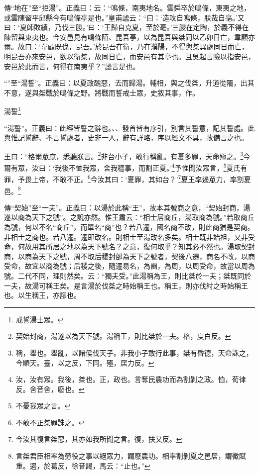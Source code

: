 {\noindent\zhuan{}\fzbyks 傳“地在”至“拒湯”。正義曰：云：“鳴條，南夷地名。雲舜卒於鳴條，東夷之地，或雲陳留平邱縣今有鳴條亭是也。”皇甫謐云：“曰：‘造攻自鳴條，朕哉自亳。’又曰：‘夏師敗績，乃伐三朡。’曰：‘王歸自克夏，至於亳。’三朡在定陶，於義不得在陳留與東夷也。今安邑見有鳴條陌、昆吾亭，以為昆吾與桀同以乙卯日亡，韋顧亦爾。故曰：‘韋顧既伐，昆吾。’於昆吾在衛，乃在濮陽，不得與桀異處同日而亡，明昆吾亦來安邑，欲以衛桀，故同日亡，而安邑有其亭也。且吳起言險以指安邑，安邑於此而言，何得在南夷乎？”謐言是也。 \par}

{\noindent\shu{}\fzkt “”至“湯誓”。正義曰：以夏政醜惡，去而歸湯。輔相，與之伐桀，升道從陑，出其不意，遂與桀戰於鳴條之野。將戰而誓戒士眾，史敘其事，作。 \par}

湯誓\footnote{戒誓湯士眾。}

{\noindent\shu{}\fzkt “湯誓”。正義曰：此經皆誓之辭也。、、發首皆有序引，別言其誓意，記其誓處。此與惟記誓辭、不言誓處者，史非一人，辭有詳略，序以經文不具，故備言之也。 \par}

王曰：“格爾眾庶，悉聽朕言。\footnote{契始封商，湯遂以為天下號。湯稱王，則比桀於一夫。格，庚白反。}非台小子，敢行稱亂。有夏多罪，天命殛之。\footnote{稱，舉也。舉亂，以諸侯伐天子。非我小子敢行此事，桀有昏德，天命誅之，今順天。臺，以之反，下同。殛，居力反。}今爾有眾，汝曰：‘我後不恤我眾，舍我穡事，而割正夏。’\footnote{汝，汝有眾。我後，桀也。正，政也。言奪民農功而為割剝之政。恤，荀律反。舍音舍，廢也。}予惟聞汝眾言，\footnote{不憂我眾之言。}夏氏有罪，予畏上帝，不敢不正。\footnote{不敢不正桀罪誅之。}今汝其曰：‘夏罪，其如台？’\footnote{今汝其復言桀惡，其亦如我所聞之言。復，扶又反。}夏王率遏眾力，率割夏邑。\footnote{言桀君臣相率為勞役之事以絕眾力，謂廢農功。相率割剝夏之邑居，謂徵賦重。遏，於葛反，徐音謁，馬云：“止也。”}


{\noindent\zhuan{}\fzbyks 傳“契始”至“一夫”。正義曰：以湯於此稱“王”，故本其號商之意，“契始封商，湯遂以商為天下之號”。之說亦然。惟王肅云：“相士居商丘，湯取商為號。”若取商丘為號，何以不名“商丘”，而單名“商”也？若八遷，國名商不改，則此商猶是契商。非相士之商也。若八遷。遷即改名。則相士至湯改名多矣。相士既非始祖，又非受命，何故用其所居之地以為天下號名？之意，復何取乎？知其必不然也。湯取契封商，以商為天下之號，周不取后稷封邰為天下之號者，契後八遷，商名不改，以商受命，故宜以商為號；后稷之後，隨遷易名，為豳，為周，以周受命，故當以周為號。二代不同，理則然矣。云：“獨夫受。”此湯稱為王，則比桀於一夫；桀既同於一夫，故湯可稱王矣。是言湯於伐桀之時始稱王也。稱王，則亦伐紂之時始稱王也。以生稱王，亦謬也。 \par}

